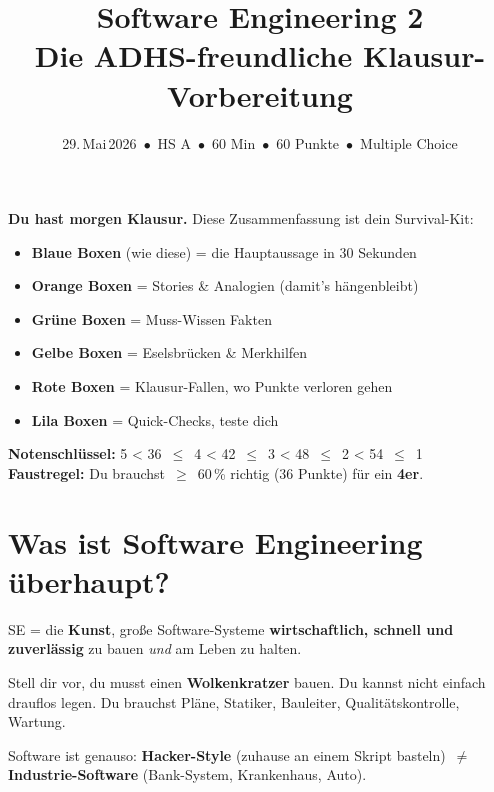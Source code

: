 \documentclass[11pt,a4paper]{article}
\title{\Huge\bfseries\color{primary}Software Engineering 2\\[6pt]\LARGE\color{secondary} Die ADHS-freundliche Klausur-Vorbereitung}
\author{\large 29.\,Mai\,2026 \,$\bullet$\, HS A \,$\bullet$\, 60 Min \,$\bullet$\, 60 Punkte \,$\bullet$\, Multiple Choice}
\date{}
\begin{document}
\maketitle
\thispagestyle{empty}

\vspace{0.5cm}

\begin{tldr}
\textbf{Du hast morgen Klausur.} Diese Zusammenfassung ist dein Survival-Kit:

\begin{itemize}
  \item \textbf{Blaue Boxen} (wie diese) = die Hauptaussage in 30 Sekunden
  \item \textbf{Orange Boxen} = Stories \& Analogien (damit's hängenbleibt)
  \item \textbf{Grüne Boxen} = Muss-Wissen Fakten
  \item \textbf{Gelbe Boxen} = Eselsbrücken \& Merkhilfen
  \item \textbf{Rote Boxen} = Klausur-Fallen, wo Punkte verloren gehen
  \item \textbf{Lila Boxen} = Quick-Checks, teste dich
\end{itemize}

\textbf{Notenschlüssel:} 5 < 36 \,$\leq$\, 4 < 42 \,$\leq$\, 3 < 48 \,$\leq$\, 2 < 54 \,$\leq$\, 1\\
\textbf{Faustregel:} Du brauchst \,$\geq$\, 60\,\% richtig (36 Punkte) für ein \textbf{4er}.
\end{tldr}

\newpage
\tableofcontents
\newpage

\section{Was ist Software Engineering überhaupt?}

\begin{tldr}
SE = die \textbf{Kunst}, große Software-Systeme \textbf{wirtschaftlich, schnell und zuverlässig} zu bauen \emph{und} am Leben zu halten.
\end{tldr}

\begin{story}
Stell dir vor, du musst einen \textbf{Wolkenkratzer} bauen. Du kannst nicht einfach drauflos legen. Du brauchst Pläne, Statiker, Bauleiter, Qualitätskontrolle, Wartung.

Software ist genauso: \textbf{Hacker-Style} (zuhause an einem Skript basteln) \,$\neq$\, \textbf{Industrie-Software} (Bank-System, Krankenhaus, Auto).
\end{story}
\end{document}
